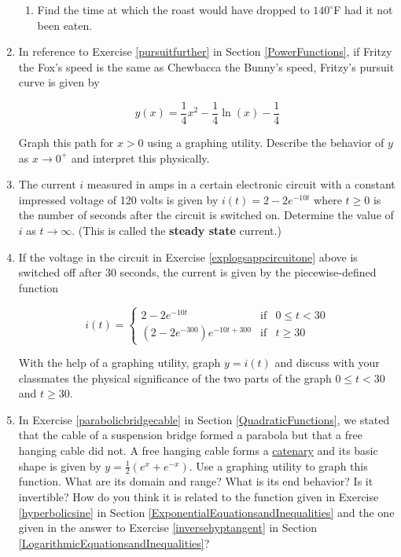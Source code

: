 \begin{enumerate}
\begin{enumerate}
\item Find the time at which the roast would have dropped to $140^{\circ}$F had it not been eaten. 

\end{enumerate}

\item  \label{pursuitlog} In reference to Exercise \ref{pursuitfurther} in Section \ref{PowerFunctions}, if Fritzy the Fox's speed is the same as Chewbacca the Bunny's speed, Fritzy's pursuit curve is given by

\[y(x) = \frac{1}{4} x^2-\frac{1}{4} \ln(x)-\frac{1}{4}\]

Graph this path for $x > 0$ using a graphing utility.  Describe the behavior of $y$ as $x \rightarrow 0^{+}$ and interpret this physically.

\item \label{explogsappcircuitone} The current $i$ measured in amps in a certain electronic circuit with a constant impressed voltage of 120 volts is given by $i(t) = 2 - 2e^{-10t}$ where $t \geq 0$ is the number of seconds after the circuit is switched on.  Determine the value of $i$ as $t \rightarrow \infty$.  (This is called the \textbf{steady state} current.)


\item If the voltage in the circuit in Exercise \ref{explogsappcircuitone} above is switched off after 30 seconds, the current is given by the piecewise-defined function 

\[i(t) = \left\{ \begin{array}{rcl} 2 - 2e^{-10t} & \mbox{if} & 0 \leq t < 30 \\ [6pt]
\left(2 - 2e^{-300}\right) e^{-10t+300} & \mbox{if} & t \geq 30 \end{array} \right.\]  

With the help of a graphing utility, graph $y = i(t)$ and discuss with your classmates the physical significance of the two parts of the graph $0 \leq t < 30$ and $t \geq 30$.


\item \label{catenary} In Exercise \ref{parabolicbridgecable} in Section \ref{QuadraticFunctions}, we stated that the cable of a suspension bridge formed a parabola but that a free hanging cable did not.  A free hanging cable forms a \underline{catenary} and its basic shape is given by $y = \frac{1}{2}\left(e^{x} + e^{-x}\right)$.  Use a graphing utility to graph this function.  What are its domain and range?  What is its end behavior?  Is it invertible?  How do you think it is related to the function given in Exercise \ref{hyperbolicsine} in Section \ref{ExponentialEquationsandInequalities} and the one given in the answer to Exercise \ref{inversehyptangent} in Section \ref{LogarithmicEquationsandInequalities}?  


\end{enumerate}

